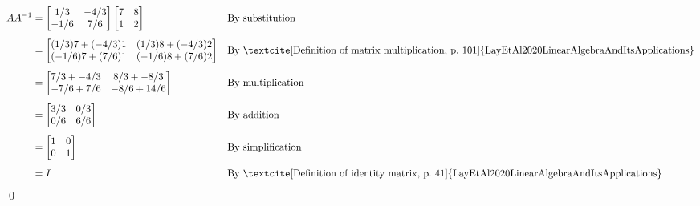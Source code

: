 \documentclass[10pt,letterpaper,final]{report}
\newcommand{\reason}[1]{&& \text{#1}}
\begin{document}
\begin{align*}
  AA^{-1} & = \begin{bmatrix}
                1/3  & -4/3 \\
                -1/6 & 7/6
              \end{bmatrix} \begin{bmatrix}
                              7 & 8 \\
                              1 & 2
                            \end{bmatrix} \reason{By substitution}                                                                         \\[1ex]
          & = \begin{bmatrix}
                (1/3)7  + (-4/3)1 & (1/3)8  + (-4/3)2 \\
                (-1/6)7 + (7/6)1  & (-1/6)8 + (7/6)2
              \end{bmatrix} \reason{By \textcite[Definition of matrix multiplication, p.~101]{LayEtAl2020LinearAlgebraAndItsApplications}} \\[1ex]
          & = \begin{bmatrix}
                7/3  + -4/3 & 8/3  + -8/3 \\
                -7/6 + 7/6  & -8/6 + 14/6
              \end{bmatrix} \reason{By multiplication}                                                                                     \\[1ex]
          & = \begin{bmatrix}
                3/3 & 0/3 \\
                0/6 & 6/6
              \end{bmatrix} \reason{By addition}                                                                                           \\[1ex]
          & = \begin{bmatrix}
                1 & 0 \\
                0 & 1
              \end{bmatrix} \reason{By simplification}                                                                                     \\[1ex]
          & = I \reason{By \textcite[Definition of identity matrix, p.~41]{LayEtAl2020LinearAlgebraAndItsApplications}}
\end{align*} \qed


\pagebreak
\end{document}
